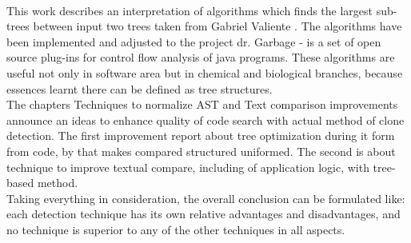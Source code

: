 \documentclass{report}
\begin{document}
\\
This work describes an interpretation of algorithms which finds the largest sub-trees between input two trees taken from Gabriel Valiente \cite{valiente}. The algorithms have been implemented and adjusted to the project dr. Garbage - is a set of open source plug-ins for control flow analysis of java programs. These algorithms are useful not only in software area but in chemical and biological branches, because essences learnt there can be defined as tree structures.
\\
The chapters Techniques to normalize AST and Text comparison improvements announce an ideas to enhance quality of code search with actual method of clone detection. The first improvement report about tree optimization during it form from code, by that makes compared structured uniformed. The second is about technique to improve textual compare, including of application logic, with tree-based method.
\\
Taking everything in consideration, the overall conclusion can be formulated like: each detection technique has its own relative advantages and disadvantages, and no technique is superior to any of the other techniques in all aspects.

\end{document}
